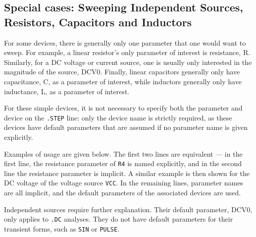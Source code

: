 \subsection{Special cases: Sweeping Independent Sources, Resistors, Capacitors and Inductors}
\label{step_SpecialCases}

For some devices, there is generally only one parameter that one would
want to sweep.  For example, a linear resistor's only parameter of
interest is resistance, R.  Similarly, for a DC voltage or current
source, one is usually only interested in the magnitude of the source, DCV0.
Finally, linear capacitors generally only have capacitance, C, as a 
parameter of interest, while inductors generally only have inductance, L,
as a parameter of interest.  

For these simple devices, it is not necessary to specify both the
parameter and device on the \texttt{.STEP} line: only the device name
is strictly required, as these devices have default
parameters that are assumed if no parameter name is given explicitly.

Examples of usage are given below.  The first two lines are equivalent
--- in the first line, the resistance parameter of \texttt{R4} is
named explicitly, and in the second line the resistance parameter is
implicit. A similar example is then shown for the DC voltage of the 
voltage source \texttt{VCC}.  In the remaining lines, parameter names are all 
implicit, and the default parameters of the associated devices are used.


Independent sources require further explanation.  Their default
parameter, DCV0, only applies to \texttt{.DC} analyses.  They do not have
default parameters for their transient forms, such as \texttt{SIN}
or \texttt{PULSE}.

